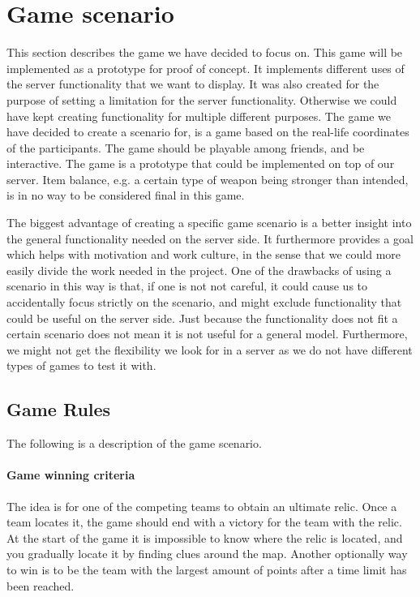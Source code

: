 \section{Game scenario}\label{sec:game}
This section describes the game we have decided to focus on. This game will be implemented as a prototype for proof of concept. It implements different uses of the server functionality that we want to display. It was also created for the purpose of setting a limitation for the server functionality. Otherwise we could have kept creating functionality for multiple different purposes. The game we have decided to create a scenario for, is a game based on the real-life coordinates of the participants. The game should be playable among friends, and be interactive. The game is a prototype that could be implemented on top of our server. Item balance, e.g. a certain type of weapon being stronger than intended, is in no way to be considered final in this game.

The biggest advantage of creating a specific game scenario is a better insight into the general functionality needed on the server side. It furthermore provides a goal which helps with motivation and work culture, in the sense that we could more easily divide the work needed in the project. One of the drawbacks of using a scenario in this way is that, if one is not not careful, it could cause us to accidentally focus strictly on the scenario, and might exclude functionality that could be useful on the server side. Just because the functionality does not fit a certain scenario does not mean it is not useful for a general model. Furthermore, we might not get the flexibility we look for in a server as we do not have different types of games to test it with.

\subsection{Game Rules}\label{subsec:game-rules}

The following is a description of the game scenario.

\paragraph{Game winning criteria}
The idea is for one of the competing teams to obtain an ultimate relic. Once a team locates it, the game should end with a victory for the team with the relic. At the start of the game it is impossible to know where the relic is located, and you gradually locate it by finding clues around the map.
Another optionally way to win is to be the team with the largest amount of points after a time limit has been reached.

